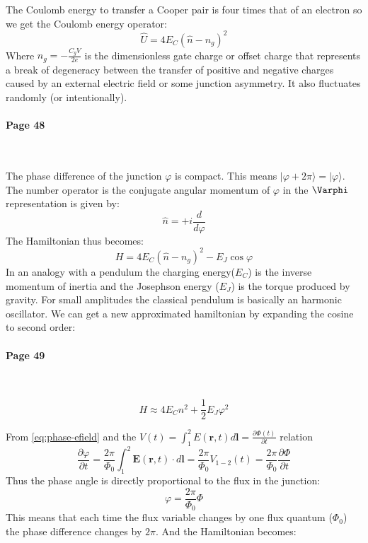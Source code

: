 \documentclass[12pt]{article}
\numberwithin{equation}{subsection}
\newcommand\page[1]{
{
\color{blue}\paragraph{
Page #1
}\mbox{}\\
}
}
\begin{document}
The Coulomb energy to transfer a Cooper pair is four times that of an electron so we get the Coulomb energy operator:
\begin{equation}
    \hat U = 4E_C(\hat n - n_g)^2
\end{equation}
Where $n_g = -\frac{C_gV}{2e}$ is the dimensionless gate charge or offset charge that represents a break of degeneracy between the transfer of positive and negative charges caused by an external electric field or some junction asymmetry. It also fluctuates randomly (or intentionally). 
\page{48}
The phase difference of the junction $\varphi$ is compact. This means $|\varphi+2\pi \rangle = | \varphi \rangle$. The number operator is the conjugate angular momentum of $\varphi$ in the $\Varphi$ representation is given by:
\begin{equation}
    \hat n = +i\frac{d}{d\varphi}
\end{equation}
The Hamiltonian thus becomes:
\begin{equation}
    H = 4E_C(\hat n - n_g)^2 - E_J\cos\varphi
    \label{eq:cpb-h}
\end{equation}
In an analogy with a pendulum the charging energy($E_C$) is the inverse momentum of inertia and the Josephson energy ($E_J$) is the torque produced by gravity. For small amplitudes the classical pendulum is basically an harmonic oscillator. We can get a new approximated hamiltonian by expanding the cosine to second order:
\page{49}
\begin{equation}
    H \approx 4E_Cn^2 + \frac{1}{2} E_J \varphi^2
\end{equation}


From \ref{eq:phase-efield} and the $V(t)=\int^2_1E(\mathbf r, t) d\mathbf l=\frac{\partial \Phi(t)}{\partial t}$ relation
\begin{equation}
    \frac{\partial\varphi}{\partial t} = \frac{2\pi}{\Phi_0}\int^2_1\mathbf E (\mathbf r , t) \cdot d\mathbf l = \frac{2\pi}{\Phi_0} V_{1-2}(t) = \frac{2\pi}{\Phi_0} \frac{\partial\Phi}{\partial t} 
\end{equation}
Thus the phase angle is directly proportional to the flux in the junction:
\begin{equation}
    \varphi = \frac{2\pi}{\Phi_0} \Phi
\end{equation}
This means that each time the flux variable changes by one flux quantum ($\Phi_0$) the phase difference changes by $2\pi$. And the Hamiltonian becomes:
\end{document}
